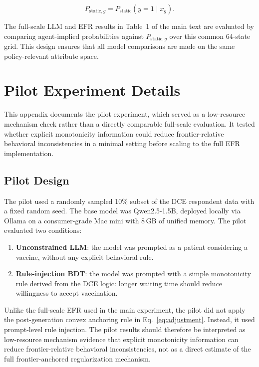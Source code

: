 \documentclass[11pt]{article}
\begin{document}
\[
P_{\text{static},g}
=
P_{\text{static}}(y=1 \mid x_g).
\]

The full-scale LLM and EFR results in Table~1 of the main text are evaluated by comparing agent-implied probabilities against \(P_{\text{static},g}\) over this common 64-state grid. This design ensures that all model comparisons are made on the same policy-relevant attribute space.



\section{Pilot Experiment Details}
\label{app:pilot}

This appendix documents the pilot experiment, which served as a low-resource mechanism check rather than a directly comparable full-scale evaluation. It tested whether explicit monotonicity information could reduce frontier-relative behavioral inconsistencies in a minimal setting before scaling to the full EFR implementation.

\subsection{Pilot Design}

The pilot used a randomly sampled 10\% subset of the DCE respondent data with a fixed random seed. The base model was Qwen2.5-1.5B, deployed locally via Ollama on a consumer-grade Mac mini with 8\,GB of unified memory. The pilot evaluated two conditions:

\begin{enumerate}
    \item \textbf{Unconstrained LLM}: the model was prompted as a patient considering a vaccine, without any explicit behavioral rule.
    \item \textbf{Rule-injection BDT}: the model was prompted with a simple monotonicity rule derived from the DCE logic: longer waiting time should reduce willingness to accept vaccination.
\end{enumerate}

Unlike the full-scale EFR used in the main experiment, the pilot did not apply the post-generation convex anchoring rule in Eq.~\eqref{eq:adjustment}. Instead, it used prompt-level rule injection. The pilot results should therefore be interpreted as low-resource mechanism evidence that explicit monotonicity information can reduce frontier-relative behavioral inconsistencies, not as a direct estimate of the full frontier-anchored regularization mechanism.
\end{document}
